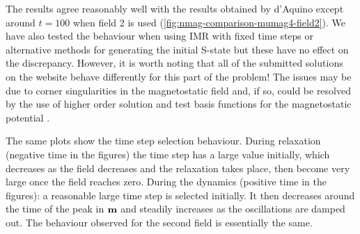 The results agree reasonably well with the results obtained by d'Aquino except around $t=100$ when field 2 is used (\cref{fig:nmag-comparison-mumag4-field2}).
We have also tested the behaviour when using IMR with fixed time steps or alternative methods for generating the initial S-state but these have no effect on the discrepancy.
However, it is worth noting that all of the submitted solutions on the \mumag website \cite{mumag-website} behave differently for this part of the problem!
The issues may be due to corner singularities in the magnetostatic field and, if so, could be resolved by the use of higher order solution and test basis functions for the magnetostatic potential \cite{Schrefl1997}.

The same plots show the time step selection behaviour.
During relaxation (negative time in the figures) the time step has a large value initially, which decreases as the field decreases and the relaxation takes place, then become very large once the field reaches zero.
During the dynamics (positive time in the figures): a reasonable large time step is selected initially.
It then decreases around the time of the peak in $\boldsymbol{\mathrm{m}}$ and steadily increases as the oscillations are damped out.
The behaviour observed for the second field is essentially the same.

%



